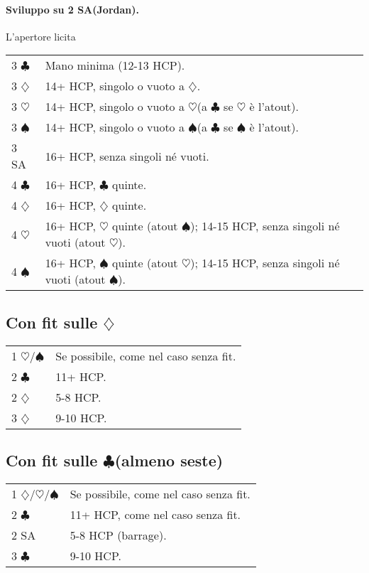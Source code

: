 \documentclass[a4paper,10pt]{article}
\renewcommand{\c}{$\clubsuit$\xspace}
\renewcommand{\d}{$\diamondsuit$\xspace}
\newcommand{\h}{$\heartsuit$\xspace}
\newcommand{\s}{$\spadesuit$\xspace}
\newcommand{\sa}{SA\xspace}
\newcommand{\smallspace}{\vskip0.3cm}
\newenvironment{twocol}
  {\smallspace\noindent\begin{tabular}{l p{0.8\textwidth}}}
  {\end{tabular}\smallspace}
\begin{document}
\paragraph{Sviluppo su 2 \sa (Jordan).} L'apertore licita
\begin{twocol}
 3 \c & Mano minima (12-13 HCP).\\
 3 \d & 14+ HCP, singolo o vuoto a \d.\\
 3 \h & 14+ HCP, singolo o vuoto a \h (a \c se \h è l'atout).\\
 3 \s & 14+ HCP, singolo o vuoto a \s (a \c se \s è l'atout).\\
 3 \sa & 16+ HCP, senza singoli né vuoti.\\
 4 \c & 16+ HCP, \c quinte.\\
 4 \d & 16+ HCP, \d quinte.\\
 4 \h & 16+ HCP, \h quinte (atout \s); 14-15 HCP, senza singoli né vuoti (atout \h).\\
 4 \s & 16+ HCP, \s quinte (atout \h); 14-15 HCP, senza singoli né vuoti (atout \s).
\end{twocol}

\subsection{Con fit sulle \d}

\begin{twocol}
 1 \h/\s & Se possibile, come nel caso senza fit.\\
 2 \c  & 11+ HCP.\\
 2 \d  & 5-8 HCP.\\
 3 \d  & 9-10 HCP.\\
\end{twocol}

\subsection{Con fit sulle \c (almeno seste)}

\begin{twocol}
 1 \d/\h/\s & Se possibile, come nel caso senza fit.\\
 2 \c & 11+ HCP, come nel caso senza fit.\\
 2 \sa & 5-8 HCP (barrage).\\
 3 \c & 9-10 HCP.\\
\end{twocol}



\pagebreak
\end{document}

